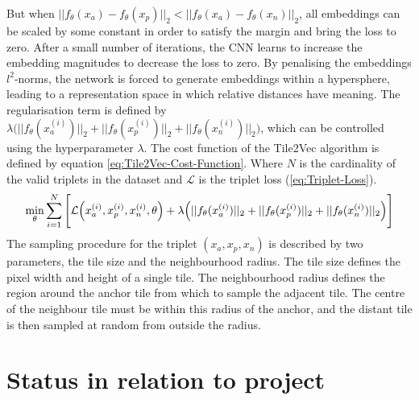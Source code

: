 \newline
But when $||f_\theta(x_a) - f_\theta(x_p)||_2 < ||f_\theta(x_a) - f_\theta(x_n)||_2$, all embeddings can be scaled by some constant in order to satisfy the margin and bring the loss to zero. After a small number of iterations, the \gls{CNN} learns to increase the embedding magnitudes to decrease the loss to zero. By penalising the embeddings $l^2$-norms, the network is forced to generate embeddings within a hypersphere, leading to a representation space in which relative distances have meaning. The regularisation term is defined by $\lambda \Big(||f_\theta(x_a^{(i)})||_2 + ||f_\theta(x_p^{(i)})||_2 + ||f_\theta(x_n^{(i)})||_2\Big)$, which can be controlled using the hyperparameter $\lambda$. The cost function of the Tile2Vec algorithm is defined by equation \ref{eq:Tile2Vec-Cost-Function}. Where $N$ is the cardinality of the valid triplets in the dataset and $\mathcal{L}$ is the triplet loss (\ref{eq:Triplet-Loss}).
\begin{equation}
    \centering
    \min_\theta \sum_{i=1}^N \Bigg[\mathcal{L}\Big(x_a^{(i)}, x_p^{(i)}, x_n^{(i)}, \theta\Big) + \lambda \Big(||f_\theta(x_a^{(i)})||_2 + ||f_\theta(x_p^{(i)})||_2 + ||f_\theta(x_n^{(i)})||_2\Big)\Bigg]
    \label{eq:Tile2Vec-Cost-Function}
\end{equation}
The sampling procedure for the triplet $(x_a, x_p, x_n)$ is described by two parameters, the tile size and the neighbourhood radius. The tile size defines the pixel width and height of a single tile. The neighbourhood radius defines the region around the anchor tile from which to sample the adjacent tile. The centre of the neighbour tile must be within this radius of the anchor, and the distant tile is then sampled at random from outside the radius.

\section{Status in relation to project}
\label{sec:Status-Relation-Project}


